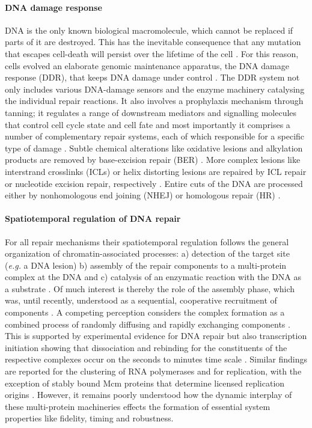 \paragraph{DNA damage response}    
DNA is the only known biological macromolecule, which cannot be replaced if parts of it are destroyed. This has the inevitable consequence that any mutation that escapes cell-death will persist over the lifetime of the cell \cite{Hoeijmakers2009,Marteijn2014}. For this reason, cells evolved an elaborate genomic maintenance apparatus, the DNA damage response (DDR), that keeps DNA damage under control \cite{Ciccia2010}. The DDR system not only includes various DNA-damage sensors and the enzyme machinery catalysing the individual repair reactions. It also  involves a prophylaxis mechanism through tanning; it regulates a range of downstream mediators and signalling molecules that control cell cycle state and cell fate and most importantly it comprises a number of complementary repair systems, each of which responsible for a specific type of damage \cite{Ciccia2010,Marteijn2014}. Subtle chemical alterations like oxidative lesions and alkylation products are removed by base-excision repair (BER) \cite{Lindahl2000,Caldecott2008}. More complex lesions like interstrand crosslinks (ICLs) or helix distorting lesions are repaired by ICL repair or nucleotide excision repair, respectively \cite{Moldovan2009,Hoeijmakers2009}. Entire cuts of the DNA are processed either by nonhomologous end joining (NHEJ) or homologous repair (HR) \cite{Caldecott2008,West2003}. 

\paragraph{Spatiotemporal regulation of DNA repair} For all repair mechanisms their spatiotemporal regulation follows the general organization of chromatin-associated processes: a) detection of the target site (\textit{e.g.} a DNA lesion) b) assembly of the repair components to a multi-protein complex at the DNA and c) catalysis of an enzymatic reaction with the DNA as a substrate \cite{Hoeijmakers:2001:Nature:11357144,Gillet:2006:Chem-Rev:16464005,Dinant:2009:J-Cell-Biol:19332890,Luijsterburg2010}. Of much interest is thereby the role of the assembly phase, which was, until recently, understood as a sequential, cooperative recruitment of components \cite{Volker2001}. A competing perception considers the complex formation as a combined process of randomly diffusing and rapidly exchanging components \cite{Luijsterburg2010}. This is supported by experimental evidence for DNA repair but also transcription initiation showing that dissociation and rebinding for the constituents of the respective complexes occur on the seconds to minutes time scale \cite{Vermeulen2011,Stasevich2011}. Similar findings are reported for the clustering of RNA polymerases and for replication, with the exception of stably bound Mcm proteins that determine licensed replication origins \cite{Kuipers2011,Sonneville2012}. However, it remains poorly understood how the dynamic interplay of these multi-protein machineries effects the formation of essential system properties like fidelity, timing and robustness. 




